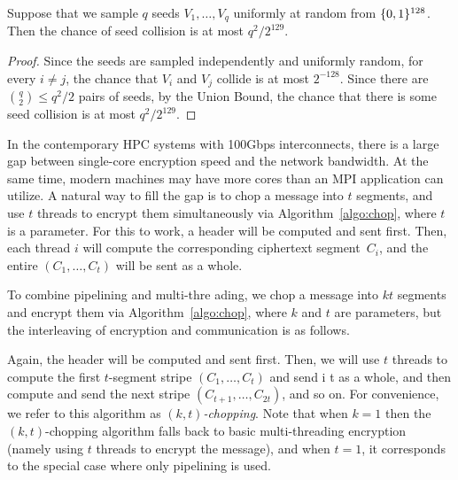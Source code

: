 \begin{proposition}
Suppose that we sample $q$ seeds $V_1, \ldots, V_q$ uniformly at random from $\{0,1\}^{128}$.
Then the chance of seed collision is at most $q^2 / 2^{129}$.
\end{proposition}
\begin{proof}
Since the seeds are sampled independently and uniformly random,
for every $i \ne j$, the chance that $V_i$ and $V_j$ collide is at most $2^{-128}$.
Since there are ${q \choose 2} \leq q^2 /2$ pairs of seeds,
by the Union Bound, the chance that there is some seed collision is at most $q^2 / 2^{129}$.
\end{proof}

In the contemporary HPC systems with 100Gbps interconnects, there is a large gap
between single-core encryption speed and the network bandwidth.
At the same time, modern machines may have more cores than an MPI application can
utilize. A natural way to fill the gap is to
chop a message into $t$ segments,
and use $t$ threads to encrypt them simultaneously via Algorithm~\ref{algo:chop},
where $t$ is a parameter. For this to work, a header will be computed and sent first.
Then, each thread $i$ will compute the corresponding ciphertext segment~$C_i$,
and the entire $(C_1, \ldots, C_t)$ will be sent as a whole.

  To combine pipelining and multi-thre
ading,
we chop a message into $kt$ segments and encrypt them via Algorithm~\ref{algo:chop},
where $k$ and $t$ are parameters,
but the interleaving of encryption and communication is as follows.

Again, the header will be computed and sent first.
Then, we will use $t$ threads to compute the first $t$-segment stripe $(C_1, \ldots, C_t)$ and send i
t as a whole,
and then compute  and send the next stripe $(C_{t + 1}, \ldots, C_{2t})$, and so on.
For convenience, we refer to this algorithm as \emph{$(k, t)$-chopping}.
Note that when $k = 1$ then the
$(k, t)$-chopping algorithm falls back to basic multi-threading encryption (namely using
$t$ threads to encrypt the message),
and when $t = 1$, it corresponds to the special case where only pipelining is used.


